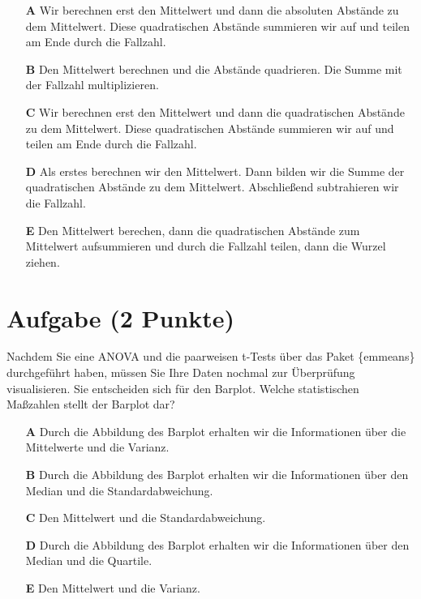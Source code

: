 \documentclass[a4paper, 9pt]{scrartcl}\usepackage[]{graphicx}\usepackage[]{xcolor}
\begin{document}
\begin{enumerate}
\item [\textbf{A} \msquare] Wir berechnen erst den Mittelwert und dann die absoluten Abstände zu dem Mittelwert. Diese quadratischen Abstände summieren wir auf und teilen am Ende durch die Fallzahl.
\item [\textbf{B} \msquare] Den Mittelwert berechnen und die Abstände quadrieren. Die Summe mit der Fallzahl multiplizieren.
\item [\textbf{C} \msquare] Wir berechnen erst den Mittelwert und dann die quadratischen Abstände zu dem Mittelwert. Diese quadratischen Abstände summieren wir auf und teilen am Ende durch die Fallzahl.
\item [\textbf{D} \msquare] Als erstes berechnen wir den Mittelwert. Dann bilden wir die Summe der quadratischen Abstände zu dem Mittelwert. Abschließend subtrahieren wir die Fallzahl.
\item [\textbf{E} \msquare] Den Mittelwert berechen, dann die quadratischen Abstände zum Mittelwert aufsummieren und durch die Fallzahl teilen, dann die Wurzel ziehen.
\end{enumerate} 

\section{Aufgabe \hfill (2 Punkte)}



Nachdem Sie eine ANOVA und die paarweisen t-Tests über das \Rlogo Paket \{emmeans\} durchgeführt haben, müssen Sie Ihre Daten nochmal zur Überprüfung visualisieren. Sie entscheiden sich für den Barplot. Welche statistischen Maßzahlen stellt der Barplot dar?

 



\begin{enumerate}
\item [\textbf{A} \msquare] Durch die Abbildung des Barplot erhalten wir die Informationen über die Mittelwerte und die Varianz.
\item [\textbf{B} \msquare] Durch die Abbildung des Barplot erhalten wir die Informationen über den Median und die Standardabweichung.
\item [\textbf{C} \msquare] Den Mittelwert und die Standardabweichung.
\item [\textbf{D} \msquare] Durch die Abbildung des Barplot erhalten wir die Informationen über den Median und die Quartile.
\item [\textbf{E} \msquare] Den Mittelwert und die Varianz.
\end{enumerate}
\end{document}

